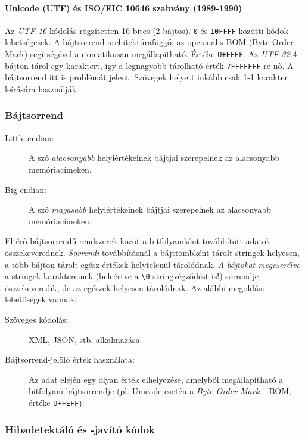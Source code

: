 \documentclass[10pt]{article}
\begin{document}
\paragraph{Unicode (UTF) és ISO/EIC 10646 szabvány (1989-1990)} Az \emph{UTF-16} kódolás rögzítetten 16-bites (2-bájtos). \texttt{0} és \texttt{10FFFF} közötti kódok lehetségesek. A bájtsorrend architektúrafüggő, az opcionális BOM (Byte Order Mark) segítségével automatikusan megállapítható. Értéke \texttt{U+FEFF}. Az \emph{UTF-32} 4 bájton tárol egy karaktert, így a legnagyobb tárolható érték \texttt{7FFFFFFF}-re nő. A bájtsorrend itt is problémát jelent. Szövegek helyett inkább csak 1-1 karakter leírására használják.

\subsubsection{Bájtsorrend}

\begin{description}
	\item[Little-endian:] A szó \emph{alacsonyabb} helyiértékeinek bájtjai szerepelnek az alacsonyabb memóriacímeken.
	\item[Big-endian:] A szó \emph{magasabb} helyiértékeinek bájtjai szerepelnek az alacsonyabb memóriacímeken.
\end{description}

Eltérő bájtsorrendű rendszerek közöt a bitfolyamként továbbított adatok összekeverednek. \emph{Sorrendi} továbbításnál a bájttömbként tárolt stringek helyesen, a több bájton tárolt egész értékek helytelenül tárolódnak. \emph{A bájtokat megcserélve} a stringek karaktereinek (beleértve a \texttt{\textbackslash0} stringvégződést is!) sorrendje összekeveredik, de az egészek helyesen tárolódnak. Az alábbi megoldási lehetőségek vannak:
\begin{description}
	\item[Szöveges kódolás:] XML, JSON, stb. alkalmazása.
	\item[Bájtsorrend-jelölő érték használata:] Az adat elején egy olyan érték elhelyezése, amelyből megállapítható a bitfolyam bájtsorrendje (pl. Unicode esetén a \emph{Byte Order Mark} -- BOM, értéke \texttt{U+FEFF}).
\end{description}

\subsubsection{Hibadetektáló és -javító kódok}
\end{document}
